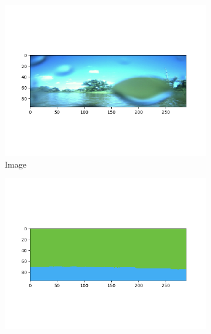 \documentclass[10pt,twocolumn,letterpaper]{article}
\begin{document}
\begin{figure}[hpt]
\begin{center}
	
	\begin{subfigure}{0.3\textwidth}
  		\includegraphics[width=\linewidth, trim={1.25cm 1.5cm 1.5cm 1.25cm},clip]{image1.png}
  		\caption{Image}
  	  \end{subfigure}
  	  \hfill
  	  \begin{subfigure}{0.3\textwidth}
  		\includegraphics[width=\linewidth,trim={1.25cm 1.5cm 1.5cm 1.25cm},clip]{gt1.png}

\end{subfigure}
\end{center}
\end{figure}
\end{document}
